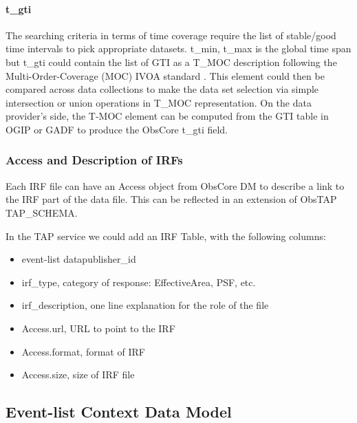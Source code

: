 \documentclass[11pt,a4paper]{ivoa}
\begin{document}
{%


\paragraph{t\_gti}

The searching criteria in terms of time coverage require the list of stable/good time intervals to pick appropriate datasets.
t\_min, t\_max is the global time span but t\_gti could contain the list of \gls{GTI} as a T\_MOC description following the Multi-Order-Coverage (MOC) \gls{IVOA} standard \citep{2022ivoa.spec.0727F}.
This element could then be compared across data collections to make the data set selection via simple intersection or union operations in T\_MOC representation.
On the data provider's side, the T-MOC element can be computed from the \gls{GTI} table in \gls{OGIP} or \gls{GADF} to produce the ObsCore t\_gti field.




\subsubsection{Access and Description of IRFs}

Each \gls{IRF} file can have an Access object from ObsCore DM to describe a link to the \gls{IRF} part of the data file.
This can be reflected in an extension of ObsTAP TAP\_SCHEMA.

In the \gls{TAP} service we could add an \gls{IRF} Table, with the following columns:

\begin{itemize}
    \item event-list datapublisher\_id
    \item irf\_type, category of response: EffectiveArea, \gls{PSF}, etc.
    \item irf\_description, one line explanation for the role of the file
    \item Access.url, URL to point to the \gls{IRF}
    \item Access.format, format of \gls{IRF}
    \item Access.size, size of \gls{IRF} file
\end{itemize}



\subsection{Event-list Context Data Model}
\label{sec:EventListContext}

}
\end{document}
